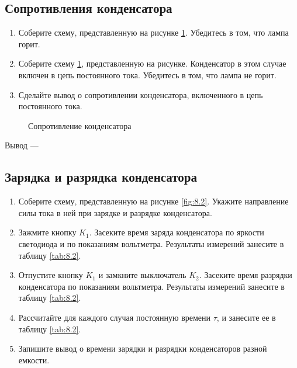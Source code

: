 \subsection{Сопротивления конденсатора}

\begin{enumerate}
	\item Соберите схему, представленную на рисунке \ref{ris:8.1}.  Убедитесь в том, что лампа горит. 
	\item Соберите схему \ref{ris:8.1}, представленную на рисунке. Конденсатор в этом случае включен в цепь постоянного тока. Убедитесь в том, что лампа не горит. 
	\item Сделайте вывод о сопротивлении конденсатора, включенного в цепь постоянного тока.
\end{enumerate}

\begin{figure}[h]
\begin{minipage}[h]{0.5\linewidth}
\end{minipage}
\hfill
\begin{minipage}[h]{0.5\linewidth}
\end{minipage}
\caption{Сопротивление конденсатора}
\label{ris:8.1}
\end{figure}

Вывод --- \hrulefill

\hrulefill

\hrulefill


\subsection{Зарядка и разрядка конденсатора}

\begin{enumerate}
	\item Соберите схему, представленную на рисунке \ref{fig:8.2}. Укажите направление силы тока в ней при зарядке и разрядке конденсатора.
	\item Зажмите кнопку $K_1$. Засеките время заряда конденсатора по яркости светодиода и по показаниям вольтметра. Результаты измерений занесите в таблицу \ref{tab:8.2}. 
	\item Отпустите кнопку $K_1$ и замкните выключатель $K_2$. Засеките время разрядки конденсатора по показаниям вольтметра. Результаты измерений занесите в таблицу \ref{tab:8.2}.
	\item Рассчитайте для каждого случая постоянную времени $\tau$, и занесите ее в таблицу \ref{tab:8.2}.
	\item Запишите вывод о времени зарядки и разрядки конденсаторов разной емкости. 
\end{enumerate}

